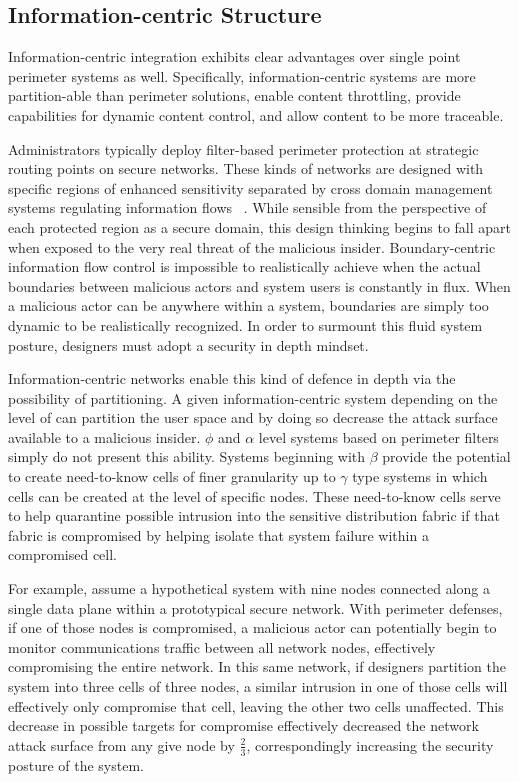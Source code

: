 \subsection{Information-centric Structure}
Information-centric integration exhibits clear advantages over single point perimeter systems as well.  Specifically, information-centric systems are more partition-able than perimeter solutions, enable content throttling, provide capabilities for dynamic content control, and allow content to be more traceable.

Administrators typically deploy filter-based perimeter protection at strategic routing points on secure networks.  These kinds of networks are designed with specific regions of enhanced sensitivity separated by cross domain management systems regulating information flows ~\cite{proposal:nsa-arch,proposal:raytheon-arch,proposal:bah-arch}.  While sensible from the perspective of each protected region as a secure domain, this design thinking begins to fall apart when exposed to the very real threat of the malicious insider.  Boundary-centric information flow control is impossible to realistically achieve when the actual boundaries between malicious actors and system users is constantly in flux.  When a malicious actor can be anywhere within a system, boundaries are simply too dynamic to be realistically recognized.  In order to surmount this fluid system posture, designers must adopt a security in depth mindset.

Information-centric networks enable this kind of defence in depth via the possibility of partitioning.  A given information-centric system depending on the level of can partition the user space and by doing so decrease the attack surface available to a malicious insider.  $\phi$ and $\alpha$ level systems based on perimeter filters simply do not present this ability.  Systems beginning with $\beta$ provide the potential to create need-to-know cells of finer granularity up to $\gamma$ type systems in which cells can be created at the level of specific nodes.  These need-to-know cells serve to help quarantine possible intrusion into the sensitive distribution fabric if that fabric is compromised by helping isolate that system failure within a compromised cell.

For example, assume a hypothetical system with nine nodes connected along a single data plane within a prototypical secure network.  With perimeter defenses, if one of those nodes is compromised, a malicious actor can potentially begin to monitor communications traffic between all network nodes, effectively compromising the entire network.  In this same network, if designers partition the system into three cells of three nodes, a similar intrusion in one of those cells will effectively only compromise that cell, leaving the other two cells unaffected.  This decrease in possible targets for compromise effectively decreased the network attack surface from any give node by $\frac{2}{3}$, correspondingly increasing the security posture of the system.

